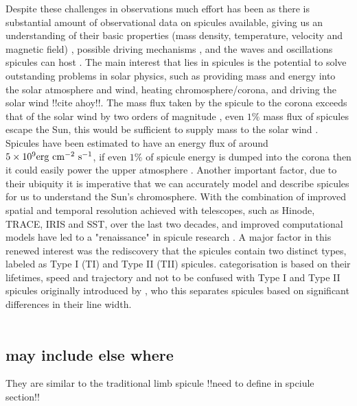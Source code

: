 \documentclass[12pt]{ociamthesis}
\newcommand{\np}{\\ \\}
\begin{document}
Despite these challenges in observations much effort has been as there is substantial amount of observational data on spicules available, giving us an understanding of their basic properties (mass density, temperature, velocity and magnetic field) \citep[see reviews:][]{Beckers1968, Beckers1972ARA&A}, possible driving mechanisms \citep[see review:][]{Sterling_2000SoPh}, and the waves and oscillations spicules can host \citep[see review:][]{Zaqarashvili_2009SSRv}. The main interest that lies in spicules is the potential to solve outstanding problems in solar physics, such as providing mass and energy into the solar atmosphere and wind, heating chromosphere/corona, and driving the solar wind \citep{Pontieu2011Sci, Moore2011ApJ731L18M, Henriques2016, Samanta2019Sci} {\color{green} !!cite ahoy!!}. The mass flux taken by the spicule to the corona exceeds that of the solar wind by two orders of magnitude \citep{Thomas1961}, even $1\%$ mass flux of spicules escape the Sun, this would be sufficient to supply mass to the solar wind \citep{Pneuman1977AA55305P, Pneuman1978SoPh5749P, Tian2014Sci346A315T, Samanta2015ApJ815L16S}. Spicules have been estimated to have an energy flux of around $5\times10^9\rm{erg~cm^{-2}~s^{-1}}$, if even $1\%$ of spicule energy is dumped into the corona then it could easily power the upper atmosphere \citep{Zaqarashvili_2009SSRv}. Another important factor, due to their ubiquity it is imperative that we can accurately model and describe spicules for us to understand the Sun's chromosphere. With the combination of improved spatial and temporal resolution achieved with telescopes, such as Hinode, TRACE, IRIS and SST, over the last two decades, and improved computational models have led to a "renaissance" in spicule research \citep{Aschwanden2019ASSL}. A major factor in this renewed interest was the rediscovery that the spicules contain two distinct types, labeled as Type I (TI) and Type II (TII) spicules. \citep{Pontieu2007PASJ} categorisation is based on their lifetimes, speed and trajectory and not to be confused with Type I and Type II spicules originally introduced by \cite{Beckers1968}, who this separates spicules based on significant differences in their line width. \np
\subsection{may include else where}
They are similar to the traditional limb spicule {\color{green} !!need to define in spciule section!!}
\end{document}

